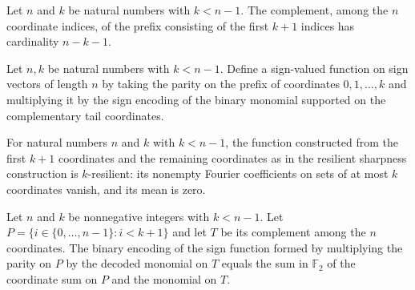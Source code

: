 \begin{theorem}
\label{FABL.card_resilientSharpnessTail}
\leanok
{}
Let $n$ and $k$ be natural numbers with $k<n-1$. The complement, among the $n$
coordinate indices, of the prefix consisting of the first $k+1$ indices has cardinality
$n-k-1$.
\end{theorem}

\begin{definition}
\label{FABL.resilientDegreeSharpnessFunction}
\leanok
{}
Let $n,k$ be natural numbers with $k<n-1$. Define a sign-valued function on sign vectors
of length $n$ by taking the parity on the prefix of coordinates $0,1,\ldots,k$ and
multiplying it by the sign encoding of the binary monomial supported on the
complementary tail coordinates.
\end{definition}

\begin{theorem}
\label{FABL.resilientDegreeSharpnessFunction_isResilient}
\leanok
{}
For natural numbers $n$ and $k$ with $k<n-1$, the function constructed from the first
$k+1$ coordinates and the remaining coordinates as in the resilient sharpness
construction is $k$-resilient: its nonempty Fourier coefficients on sets of at most $k$
coordinates vanish, and its mean is zero.
\end{theorem}

\begin{theorem}
\leanok
{}
Let $n$ and $k$ be nonnegative integers with $k<n-1$. Let
$P=\{i\in\{0,\ldots,n-1\}:i<k+1\}$ and let $T$ be its complement among the $n$
coordinates. The binary encoding of the sign function formed by multiplying the parity
on $P$ by the decoded monomial on $T$ equals the sum in $\mathbb F_2$ of the coordinate
sum on $P$ and the monomial on $T$.
\end{theorem}

